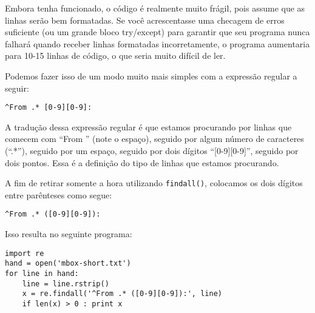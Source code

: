 
Embora tenha funcionado, o código é realmente muito frágil, pois assume que as linhas serão bem 
formatadas. Se você acrescentasse uma checagem de erros suficiente (ou um grande bloco try/except) 
para garantir que seu programa nunca falhará quando receber linhas formatadas incorretamente, o programa 
aumentaria para 10-15 linhas de código, o que seria muito difícil de ler.

Podemos fazer isso de um modo muito mais simples com a expressão regular a seguir:

\beforeverb
\begin{verbatim}
^From .* [0-9][0-9]:
\end{verbatim}
\afterverb
%

A tradução dessa expressão regular é que estamos procurando por linhas que comecem com ``From ''
(note o espaço), seguido por algum número de caracteres (``.*''), seguido por um espaço, seguido por 
dois dígitos ``[0-9][0-9]'', seguido por dois pontos. Essa é a definição do tipo de linhas que estamos 
procurando.

A fim de retirar somente a hora utilizando {\tt findall()}, colocamos os dois dígitos entre parênteses 
como segue:

\beforeverb
\begin{verbatim}
^From .* ([0-9][0-9]):
\end{verbatim}
\afterverb
%

Isso resulta no seguinte programa:

\beforeverb
\begin{verbatim}
import re
hand = open('mbox-short.txt')
for line in hand:
    line = line.rstrip()
    x = re.findall('^From .* ([0-9][0-9]):', line)
    if len(x) > 0 : print x
\end{verbatim}
\afterverb
%

